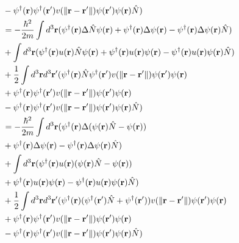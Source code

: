 \documentclass{article}
\begin{document}
\begin{align}
\begin{split}
&-\psi^\dagger(\vb{r})\psi^\dagger(\vb{r}')v(\|\vb{r}-\vb{r}'\|)\psi(\vb{r}')\psi(\vb{r})\hat{N})\\
&=-\frac{\hbar^2}{2m}\int d^3\vb{r}(\psi^\dagger(\vb{r})\Delta\hat{N}\psi(\vb{r})+\psi^\dagger(\vb{r})\Delta\psi(\vb{r})-\psi^\dagger(\vb{r})\Delta\psi(\vb{r})\hat{N})\\
&+\int d^3\vb{r}(\psi^\dagger(\vb{r})u(\vb{r})\hat{N}\psi(\vb{r})+\psi^\dagger(\vb{r})u(\vb{r})\psi(\vb{r})-\psi^\dagger(\vb{r})u(\vb{r})\psi(\vb{r})\hat{N})\\
&+\frac{1}{2}\int d^3\vb{r}d^3\vb{r}'(\psi^\dagger(\vb{r})\hat{N}\psi^\dagger(\vb{r}')v(\|\vb{r}-\vb{r}'\|)\psi(\vb{r}')\psi(\vb{r})\\
&+\psi^\dagger(\vb{r})\psi^\dagger(\vb{r}')v(\|\vb{r}-\vb{r}'\|)\psi(\vb{r}')\psi(\vb{r})\\
&-\psi^\dagger(\vb{r})\psi^\dagger(\vb{r}')v(\|\vb{r}-\vb{r}'\|)\psi(\vb{r}')\psi(\vb{r})\hat{N})\\
&=-\frac{\hbar^2}{2m}\int d^3\vb{r}(\psi^\dagger(\vb{r})\Delta(\psi(\vb{r})\hat{N}-\psi(\vb{r}))\\
&+\psi^\dagger(\vb{r})\Delta\psi(\vb{r})-\psi^\dagger(\vb{r})\Delta\psi(\vb{r})\hat{N})\\
&+\int d^3\vb{r}(\psi^\dagger(\vb{r})u(\vb{r})(\psi(\vb{r})\hat{N}-\psi(\vb{r}))\\
&+\psi^\dagger(\vb{r})u(\vb{r})\psi(\vb{r})-\psi^\dagger(\vb{r})u(\vb{r})\psi(\vb{r})\hat{N})\\
&+\frac{1}{2}\int d^3\vb{r}d^3\vb{r}'(\psi^\dagger(\vb{r})(\psi^\dagger(\vb{r}')\hat{N}+\psi^\dagger(\vb{r}'))v(\|\vb{r}-\vb{r}'\|)\psi(\vb{r}')\psi(\vb{r})\\
&+\psi^\dagger(\vb{r})\psi^\dagger(\vb{r}')v(\|\vb{r}-\vb{r}'\|)\psi(\vb{r}')\psi(\vb{r})\\
&-\psi^\dagger(\vb{r})\psi^\dagger(\vb{r}')v(\|\vb{r}-\vb{r}'\|)\psi(\vb{r}')\psi(\vb{r})\hat{N})\\
\end{split}
\end{align}
\end{document}
